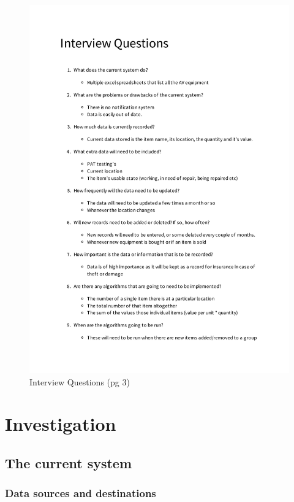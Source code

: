 \documentclass[12pt]{report}
\begin{document}
\begin{figure}[H]
    \caption{Interview Questions (pg 3)} \label{fig: Interview Questions}
    \includegraphics[page=3,width=\textwidth]{./Interview/interview_questions.pdf}
\end{figure}

\section{Investigation}

\subsection{The current system}

\subsubsection{Data sources and destinations}
\end{document}
